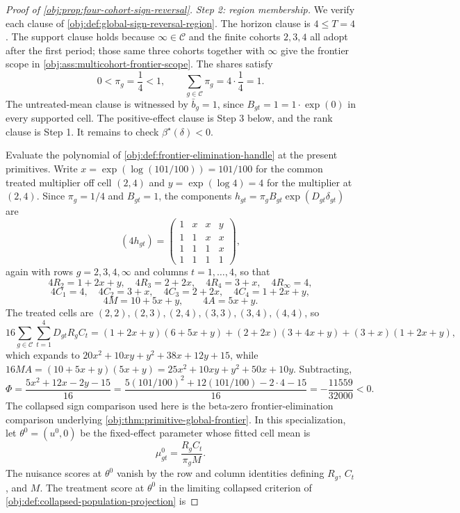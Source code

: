 \documentclass[11pt]{article}
\begin{document}
\begin{proof}[Proof of \cref{obj:prop:four-cohort-sign-reversal}]
\textit{Step 2: region membership.} We verify each clause of \cref{obj:def:global-sign-reversal-region}. The horizon clause is \(4\le T=4\). The support clause holds because \(\infty\in\mathcal C\) and the finite cohorts \(2,3,4\) all adopt after the first period; those same three cohorts together with \(\infty\) give the frontier scope in \cref{obj:ass:multicohort-frontier-scope}. The shares satisfy
\[
0<\pi_g=\frac14<1,
\qquad
\sum_{g\in\mathcal C}\pi_g=4\cdot\frac14=1 .
\]
The untreated-mean clause is witnessed by \(\bar b_g=1\), since \(B_{gt}=1=1\cdot\exp(0)\) in every supported cell. The positive-effect clause is Step 3 below, and the rank clause is Step 1. It remains to check \(\beta^\star(\delta)<0\).

Evaluate the polynomial of \cref{obj:def:frontier-elimination-handle} at the present primitives. Write \(x=\exp(\log(101/100))=101/100\) for the common treated multiplier off cell \((2,4)\) and \(y=\exp(\log4)=4\) for the multiplier at \((2,4)\). Since \(\pi_g=1/4\) and \(B_{gt}=1\), the components \(h_{gt}=\pi_gB_{gt}\exp(D_{gt}\delta_{gt})\) are
\[
(4h_{gt})
=
\begin{pmatrix}
1&x&x&y\\
1&1&x&x\\
1&1&1&x\\
1&1&1&1
\end{pmatrix},
\]
again with rows \(g=2,3,4,\infty\) and columns \(t=1,\ldots,4\), so that
\[
4R_2=1+2x+y,\quad 4R_3=2+2x,\quad 4R_4=3+x,\quad 4R_\infty=4,
\]
\[
4C_1=4,\quad 4C_2=3+x,\quad 4C_3=2+2x,\quad 4C_4=1+2x+y,
\]
\[
4M=10+5x+y,
\qquad
4A=5x+y .
\]
The treated cells are \((2,2),(2,3),(2,4),(3,3),(3,4),(4,4)\), so
\[
16\sum_{g\in\mathcal C}\sum_{t=1}^4 D_{gt}R_gC_t
=
(1+2x+y)(6+5x+y)+(2+2x)(3+4x+y)+(3+x)(1+2x+y),
\]
which expands to \(20x^2+10xy+y^2+38x+12y+15\), while
\(16MA=(10+5x+y)(5x+y)=25x^2+10xy+y^2+50x+10y\). Subtracting,
\[
\Phi
=
\frac{5x^2+12x-2y-15}{16}
=
\frac{5(101/100)^2+12(101/100)-2\cdot4-15}{16}
=
-\frac{11559}{32000}
<0 .
\]
The collapsed sign comparison used here is the beta-zero frontier-elimination comparison underlying \cref{obj:thm:primitive-global-frontier}. In this specialization, let \(\theta^0=(u^0,0)\) be the fixed-effect parameter whose fitted cell mean is
\[
\mu^0_{gt}=\frac{R_gC_t}{\pi_gM} .
\]
The nuisance scores at \(\theta^0\) vanish by the row and column identities defining \(R_g\), \(C_t\), and \(M\). The treatment score at \(\theta^0\) in the limiting collapsed criterion of \cref{obj:def:collapsed-population-projection} is

\end{proof}
\end{document}
